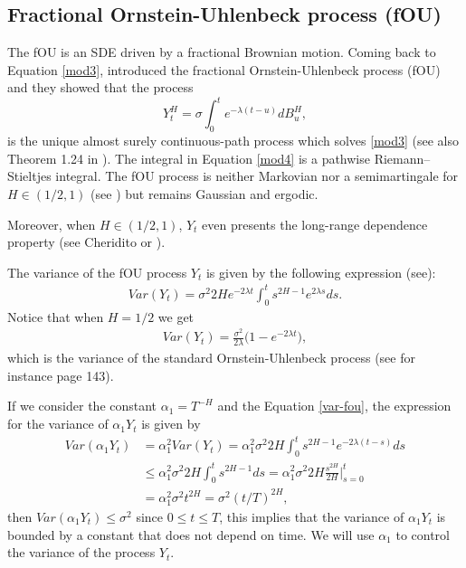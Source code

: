 \documentclass[smallextended]{svjour3}
\begin{document}
\subsection{Fractional Ornstein-Uhlenbeck process (fOU)}\label{sect-OU}


The fOU is an SDE driven by a fractional Brownian motion. 
Coming back to Equation \eqref{mod3}, \cite{ch-ka-ma}
introduced the fractional Ornstein-Uhlenbeck process (fOU) and they 
showed that the process
\begin{equation}
	Y_t ^ H = \sigma \int_0 ^ t e ^ {-\lambda(t - u)} dB_u^H, \label{mod4}
\end{equation}
is the unique almost surely continuous-path process which solves \eqref{mod3}
(see also Theorem 1.24 in \cite{ra}).
The integral in Equation \eqref{mod4} is a
pathwise Riemann–Stieltjes integral.  The fOU process is neither Markovian nor
a semimartingale for $H \in(1/2,1)$ (see \cite{du-no}) but remains
Gaussian and ergodic.

Moreover, when $H \in(1/2,1)$, $Y_t$ even presents the long-range dependence
property (see Cheridito
\cite{ch-ka-ma} or  \cite{ra}).

The variance of the fOU process $Y_t$ is given by the following expression
(see\cite{ze-ch-ya}):
\begin{align}
Var(Y_t)= \sigma^2 2H e^{-2\lambda t} \int_0^t s^{2H-1} e^{2\lambda s}
ds.\label{var-fou}
\end{align}
Notice that when $H=1/2$ we get
\begin{align}
Var(Y_t)= \frac{\sigma^2}{2\lambda}  \big(1-e^{-2\lambda t}\big),
\end{align}
which is the variance of the standard Ornstein-Uhlenbeck process (see for
instance \cite{mik} page 143). 

If we consider the constant $\alpha_1 = T^{-H}$ and the Equation
\eqref{var-fou},
the expression for the variance of $\alpha_1 Y_t$ is given by
\begin{align}
Var(\alpha_1 Y_t)&= \alpha_1^2 Var(Y_t)= \alpha_1^2\sigma^2 2H  \int_0^t
s^{2H-1} e^{-2\lambda (t-s)} ds\nonumber
\\
&\le \alpha_1^2 \sigma^2 2H  \int_0^t s^{2H-1} ds= \alpha_1^2 \sigma^2 2H
\frac{s^{2H}}{2H}\Big|_{s=0}^t \nonumber
\\
&= \alpha_1^2 \sigma^2 t^{2H} = \sigma^2 (t/T)^{2H},\label{var-fou1}
\end{align}
then $Var(\alpha_1 Y_t)\le \sigma^2 $ since $0\le t\le T$, this implies that
the variance of $\alpha_1 Y_t$
is bounded by a constant that does not depend on time. We will use $\alpha_1$
to control the variance of the process $Y_t$.
\end{document}
